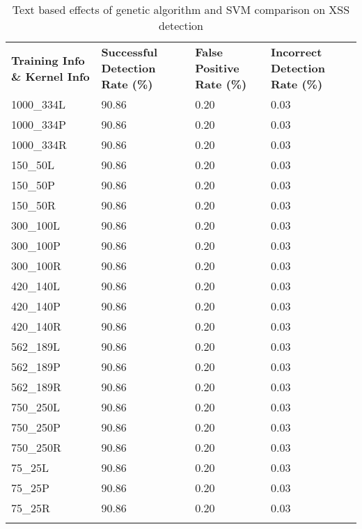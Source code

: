 \begin{appendices}
\begin{longtable}{|p{1.5in}|p{1in}|p{1in}|p{1in}|}
	\hline
	\textbf{Training Info \& Kernel Info} & \textbf{Successful Detection Rate (\%)} & \textbf{False Positive Rate (\%)} & \textbf{Incorrect Detection Rate (\%)}  \\
	\hhline{|=|=|=|=|}
	 1000\_334L & 90.86 & 0.20 & 0.03 \\ \hline
	 1000\_334P & 90.86 & 0.20 & 0.03 \\ \hline
	 1000\_334R & 90.86 & 0.20 & 0.03 \\ \hline
	   150\_50L & 90.86 & 0.20 & 0.03 \\ \hline
	   150\_50P & 90.86 & 0.20 & 0.03 \\ \hline
	   150\_50R & 90.86 & 0.20 & 0.03 \\ \hline
	  300\_100L & 90.86 & 0.20 & 0.03 \\ \hline
	  300\_100P & 90.86 & 0.20 & 0.03 \\ \hline
	  300\_100R & 90.86 & 0.20 & 0.03 \\ \hline
	  420\_140L & 90.86 & 0.20 & 0.03 \\ \hline
	  420\_140P & 90.86 & 0.20 & 0.03 \\ \hline
	  420\_140R & 90.86 & 0.20 & 0.03 \\ \hline
	  562\_189L & 90.86 & 0.20 & 0.03 \\ \hline
	  562\_189P & 90.86 & 0.20 & 0.03 \\ \hline
	  562\_189R & 90.86 & 0.20 & 0.03 \\ \hline
	  750\_250L & 90.86 & 0.20 & 0.03 \\ \hline
	  750\_250P & 90.86 & 0.20 & 0.03 \\ \hline
	  750\_250R & 90.86 & 0.20 & 0.03 \\ \hline
	    75\_25L & 90.86 & 0.20 & 0.03 \\ \hline
	    75\_25P & 90.86 & 0.20 & 0.03 \\ \hline
	    75\_25R & 90.86 & 0.20 & 0.03 \\ \hline
	\caption[]{Text based effects of genetic algorithm and SVM comparison on XSS detection}
	\label{app:xssComparisonText}
\end{longtable}


\end{appendices}
